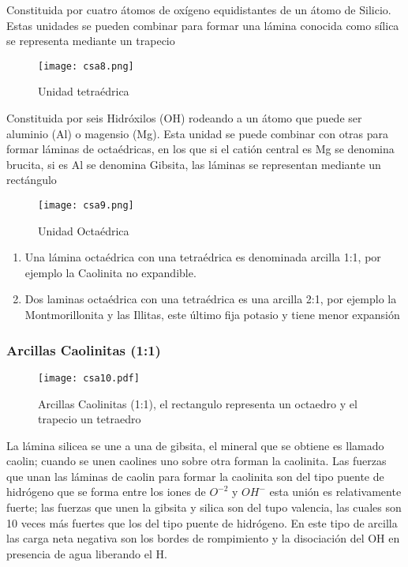 \begin{definition}
    Constituida por cuatro átomos de oxígeno equidistantes de un átomo de Silicio. Estas unidades se pueden combinar para formar una lámina conocida como sílica se representa mediante un trapecio
\end{definition}
\begin{figure}[h!]
\centering
  \texttt{[image: csa8.png]}
  \caption{Unidad tetraédrica}
  \label{csa8}
\end{figure}
\begin{definition}
    Constituida por seis Hidróxilos (OH) rodeando a un átomo que puede ser aluminio (Al) o magensio (Mg). Esta unidad se puede combinar con otras para formar láminas de octaédricas, en los que si el catión central es Mg se denomina brucita, si es Al se denomina Gibsita, las láminas se representan mediante un rectángulo
\end{definition}
\begin{figure}[h!]
\centering
  \texttt{[image: csa9.png]}
  \caption{Unidad Octaédrica}
  \label{csa9}
\end{figure}
\begin{enumerate}
    \item Una lámina octaédrica con una tetraédrica es denominada arcilla 1:1, por ejemplo la Caolinita no expandible.
    \item Dos laminas octaédrica con una tetraédrica es una arcilla 2:1, por ejemplo la Montmorillonita y las Illitas, este último fija potasio y tiene menor expansión
\end{enumerate}
\subsubsection{Arcillas Caolinitas (1:1)}

\begin{figure}[h!]
\centering
  \texttt{[image: csa10.pdf]}
  \caption{Arcillas Caolinitas (1:1), el rectangulo representa un octaedro y el trapecio un tetraedro}
  \label{csa10}
\end{figure}
La lámina silicea se une a una de gibsita, el mineral que se obtiene es llamado caolin; cuando se unen caolines uno sobre otra forman la caolinita. Las fuerzas que unan las láminas de caolin para formar la caolinita son del tipo puente de hidrógeno que se forma entre los iones de $O^{-2}$ y $OH^-$ esta unión es relativamente fuerte; las fuerzas que unen la gibsita y silica son del tupo valencia, las cuales son 10 veces más fuertes que los del tipo puente de hidrógeno. En este tipo de arcilla las carga neta negativa son los bordes de rompimiento y la disociación del OH en presencia de agua liberando el H.
